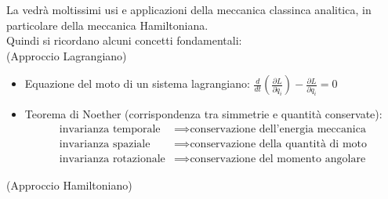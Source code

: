 La \MQ vedrà moltissimi usi e applicazioni della meccanica classinca analitica, in particolare della meccanica Hamiltoniana.\\
Quindi si ricordano alcuni concetti fondamentali:\\
(Approccio Lagrangiano)
\begin{itemize}
	\item Equazione del moto di un sistema lagrangiano: $\frac{d}{dt} \left( \frac{\partial L}{\partial \dot q_i} \right) - \frac{\partial L}{\partial q_i} = 0$
	\item Teorema di Noether (corrispondenza tra simmetrie e quantità conservate): 
	\begin{align*}
		\text{invarianza temporale} &\implies \text{conservazione dell'energia meccanica} \\
		\text{invarianza spaziale} &\implies \text{conservazione della quantità di moto} \\
		\text{invarianza rotazionale} &\implies \text{conservazione del momento angolare}
	\end{align*}
\end{itemize}
(Approccio Hamiltoniano)
